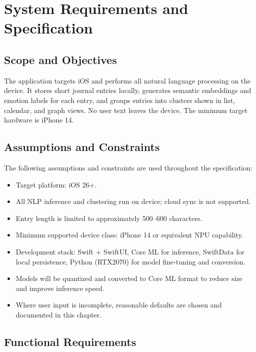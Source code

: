 \chapter{System Requirements and Specification}
\label{ch:requirements}
\section{Scope and Objectives}

The application targets iOS and performs all natural language processing on the device. It stores short journal entries locally, generates semantic embeddings and emotion labels for each entry, and groups entries into clusters shown in list, calendar, and graph views. No user text leaves the device. The minimum target hardware is iPhone 14.


\section{Assumptions and Constraints}
The following assumptions and constraints are used throughout the specification:
\begin{itemize}
  \item Target platform: iOS 26+.
  \item All NLP inference and clustering run on device; cloud sync is not supported.
  \item Entry length is limited to approximately 500--600 characters.
  \item Minimum supported device class: iPhone 14 or equivalent NPU capability.
  \item Development stack: Swift + SwiftUI, Core ML for inference, SwiftData for local persistence, Python (RTX2070) for model fine‑tuning and conversion.
  \item Models will be quantized and converted to Core ML format to reduce size and improve inference speed.
  \item Where user input is incomplete, reasonable defaults are chosen and documented in this chapter.
\end{itemize}

\section{Functional Requirements}

